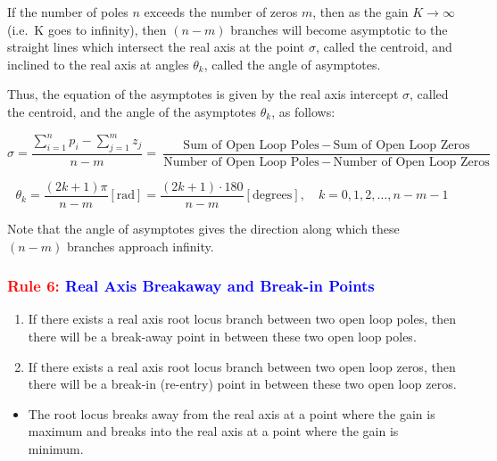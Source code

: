 \documentclass[
  14pt,
  a4paper,
  oneside,
  open=any,
  a4paper,
  14pt]{report}
\providecommand{\tightlist}{%
  \setlength{\itemsep}{0pt}\setlength{\parskip}{0pt}}\usepackage{longtable,booktabs,array}
\begin{document}
If the number of poles \(n\) exceeds the number of zeros \(m\), then as
the gain \(K \rightarrow \infty\) (i.e.~K goes to infinity), then
\((n-m)\) branches will become asymptotic to the straight lines which
intersect the real axis at the point \(\sigma\), called the centroid,
and inclined to the real axis at angles \(\theta_k\), called the angle
of asymptotes.

Thus, the equation of the asymptotes is given by the real axis intercept
\(\sigma\), called the centroid, and the angle of the asymptotes
\(\theta_k\), as follows:

\[
    \sigma = \dfrac{\sum\limits^{n}_{i=1} p_i - \sum\limits^{m}_{j=1}z_j}{n-m} = \dfrac{\text{Sum of Open Loop Poles}\, - \,\text{Sum of Open Loop Zeros}}{\text{Number of Open Loop Poles}\, - \,\text{Number of Open Loop Zeros}}
\]

\[
    \theta_k = \dfrac{(2k+1)\pi}{n-m} [\text{rad}] = \dfrac{(2k+1)\cdot180}{n-m} [\text{degrees}], \quad k = 0, 1, 2, \ldots, n-m-1
\]

Note that the angle of asymptotes gives the direction along which these
\((n-m)\) branches approach infinity.

\subsubsection*{\texorpdfstring{\textcolor{red}{Rule 6:}
\textcolor{blue}{Real Axis Breakaway and Break-in
Points}}{Rule 6: Real Axis Breakaway and Break-in Points}}\label{rule-6-real-axis-breakaway-and-break-in-points}

\begin{enumerate}
\def\labelenumi{\roman{enumi}.}
\item
  If there exists a real axis root locus branch between two open loop
  poles, then there will be a break-away point in between these two open
  loop poles.
\item
  If there exists a real axis root locus branch between two open loop
  zeros, then there will be a break-in (re-entry) point in between these
  two open loop zeros.
\end{enumerate}

\begin{itemize}
\tightlist
\item
  The root locus breaks away from the real axis at a point where the
  gain is maximum and breaks into the real axis at a point where the
  gain is minimum.
\end{itemize}
\end{document}
